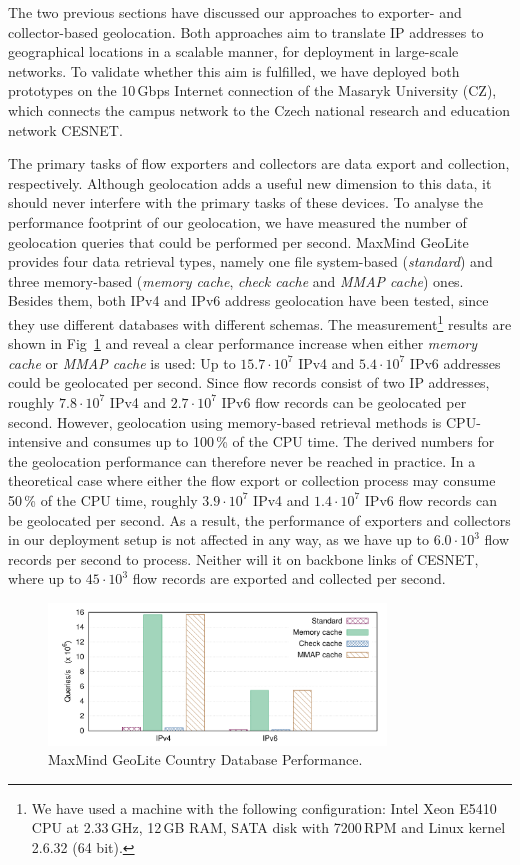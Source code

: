 The two previous sections have discussed our approaches to exporter- and collector-based geolocation. Both approaches aim to translate IP addresses to geographical locations in a scalable manner, for deployment in large-scale networks. To validate whether this aim is fulfilled, we have deployed both prototypes on the 10\,Gbps Internet connection of the Masaryk University (CZ), which connects the campus network to the Czech national research and education network CESNET.

The primary tasks of flow exporters and collectors are data export and collection, respectively. Although geolocation adds a useful new dimension to this data, it should never interfere with the primary tasks of these devices. To analyse the performance footprint of our geolocation, we have measured the number of geolocation queries that could be performed per second. MaxMind GeoLite provides four data retrieval types, namely one file system-based (\textit{standard}) and three memory-based (\textit{memory cache}, \textit{check cache} and \textit{MMAP cache}) ones. Besides them, both IPv4 and IPv6 address geolocation have been tested, since they use different databases with different schemas. The measurement\footnote{We have used a machine with the following configuration: Intel Xeon E5410 CPU at 2.33\,GHz, 12\,GB RAM, SATA disk with 7200\,RPM and Linux kernel 2.6.32 (64 bit).} results are shown in Fig~\ref{fig:geo-mm-perf} and reveal a clear performance increase when either \textit{memory cache} or \textit{MMAP cache} is used: Up to $15.7 \cdot 10^7$ IPv4 and $5.4 \cdot 10^7$ IPv6 addresses could be geolocated per second. Since flow records consist of two IP addresses, roughly $7.8 \cdot 10^7$ IPv4 and $2.7 \cdot 10^7$ IPv6 flow records can be geolocated per second. However, geolocation using memory-based retrieval methods is CPU-intensive and consumes up to 100\,\% of the CPU time. The derived numbers for the geolocation performance can therefore never be reached in practice. In a theoretical case where either the flow export or collection process may consume 50\,\% of the CPU time, roughly $3.9 \cdot 10^7$ IPv4 and $1.4 \cdot 10^7$ IPv6 flow records can be geolocated per second. As a result, the performance of exporters and collectors in our deployment setup is not affected in any way, as we have up to $6.0 \cdot 10^3$ flow records per second to process. Neither will it on backbone links of CESNET, where up to $45 \cdot 10^3$ flow records are exported and collected per second.

\begin{figure}[!tb]
    \centering
    \includegraphics[width=0.8\textwidth]{figures/paper-geolocation/performance/performance}
    \caption{MaxMind GeoLite Country Database Performance.}
    \label{fig:geo-mm-perf}
\end{figure}

